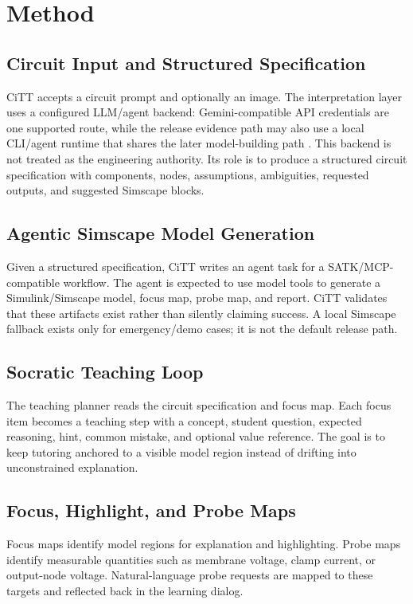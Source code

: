\section{Method}

\subsection{Circuit Input and Structured Specification}

CiTT accepts a circuit prompt and optionally an image. The interpretation layer uses a configured LLM/agent backend: Gemini-compatible API credentials are one supported route, while the release evidence path may also use a local CLI/agent runtime that shares the later model-building path \cite{gemini_api_docs}. This backend is not treated as the engineering authority. Its role is to produce a structured circuit specification with components, nodes, assumptions, ambiguities, requested outputs, and suggested Simscape blocks.

\subsection{Agentic Simscape Model Generation}

Given a structured specification, CiTT writes an agent task for a SATK/MCP-compatible workflow. The agent is expected to use model tools to generate a Simulink/Simscape model, focus map, probe map, and report. CiTT validates that these artifacts exist rather than silently claiming success. A local Simscape fallback exists only for emergency/demo cases; it is not the default release path.

\subsection{Socratic Teaching Loop}

The teaching planner reads the circuit specification and focus map. Each focus item becomes a teaching step with a concept, student question, expected reasoning, hint, common mistake, and optional value reference. The goal is to keep tutoring anchored to a visible model region instead of drifting into unconstrained explanation.

\subsection{Focus, Highlight, and Probe Maps}

Focus maps identify model regions for explanation and highlighting. Probe maps identify measurable quantities such as membrane voltage, clamp current, or output-node voltage. Natural-language probe requests are mapped to these targets and reflected back in the learning dialog.

